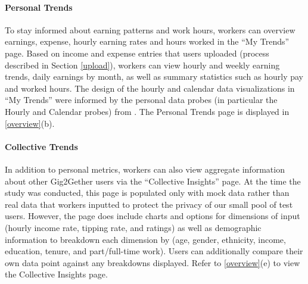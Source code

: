 \paragraph{Personal Trends} 
To stay informed about earning patterns and work hours, workers can overview earnings, expense, hourly earning rates and hours worked in the ``My Trends'' page. Based on income and expense entries that users uploaded (process described in Section \ref{upload}), workers can view hourly and weekly earning trends, daily earnings by month, as well as summary statistics such as hourly pay and worked hours. The design of the hourly and calendar data visualizations in ``My Trends'' were informed by the personal data probes (in particular the Hourly and Calendar probes) from \citet{zhang2023stakeholder}. The Personal Trends page is displayed in \ref{overview}(b).

\paragraph{Collective Trends} In addition to personal metrics, workers can also view aggregate information about other Gig2Gether users via the ``Collective Insights'' page. At the time the study was conducted, this page is populated only with mock data rather than real data that workers inputted to protect the privacy of our small pool of test users. However, the page does include charts and options for dimensions of input (hourly income rate, tipping rate, and ratings) as well as demographic information to breakdown each dimension by (age, gender, ethnicity, income, education, tenure, and part/full-time work). Users can additionally compare their own data point against any breakdowns displayed. Refer to \ref{overview}(e) to view the Collective Insights page.

